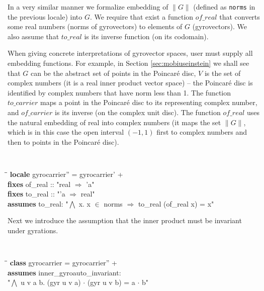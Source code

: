 \documentclass[a4paper]{article}
\theoremstyle{definition}
\begin{document}
In a very similar manner we formalize embedding of $\lVert G\rVert$
(defined as \texttt{norms} in the previous locale) into $G$.  We
require that exist a function $\mathit{of\_real}$ that converts some
real numbers (norms of gyrovectors) to elements of $G$ (gyrovectors).
We also assume that $\mathit{to\_real}$ is its inverse function (on
its codomain).

When giving concrete interpretations of gyrovector spaces, user must
supply all embedding functions. For example, in Section
\ref{sec:mobiuseinstein} we shall see that $G$ can be the abstract set
of points in the Poincar\'e disc, $V$ is the set of complex numbers
(it is a real inner product vector space) -- the Poincar\'e disc is
identified by complex numbers that have norm less than 1.  The
function $\mathit{to\_carrier}$ maps a point in the Poincar\'e disc to
its representing complex number, and $\mathit{of\_carrier}$ is its
inverse (on the complex unit disc). The function $\mathit{of\_real}$
uses the natural embedding of real into complex numbers (it maps the
set $\lVert G\rVert$, which is in this case the open interval
$(-1, 1)$ first to complex numbers and then to points in the
Poincar\'e disc).

\begin{small}
{\tt
\begin{tabbing}
  \hspace{5mm}\=\hspace{5mm}\=\kill
{\bf locale} gyrocarrier'' = gyrocarrier' +\\
\>  {\bf fixes} of\_real :: "real $\Rightarrow$ 'a"\\
\>  {\bf fixes} to\_real :: "'a $\Rightarrow$ real"\\
\>  {\bf assumes} to\_real: "$\bigwedge$ x. x $\in$ norms $\Longrightarrow$ to\_real (of\_real x) = x"
\end{tabbing}
}
\end{small}

Next we introduce the assumption that the inner product must be
invariant under gyrations.

\begin{small}
{\tt
\begin{tabbing}
  \hspace{5mm}\=\hspace{5mm}\=\kill
{\bf class} gyrocarrier = gyrocarrier'' +  \\
\> {\bf assumes} inner\_gyroauto\_invariant: \\
\>\>"$\bigwedge$ u v a b. (gyr u v a) $\cdot$ (gyr u v b) = a $\cdot$ b"
\end{tabbing}
}
\end{small}
\end{document}
